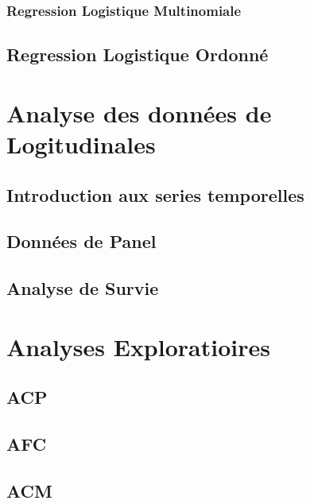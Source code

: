 \documentclass[
]{book}
\begin{document}
\hypertarget{regression-logistique-multinomiale}{%
\subsection{Regression Logistique Multinomiale}\label{regression-logistique-multinomiale}}

\hypertarget{regression-logistique-ordonnuxe9}{%
\section{Regression Logistique Ordonné}\label{regression-logistique-ordonnuxe9}}

\hypertarget{analyse-des-donnuxe9es-de-logitudinales}{%
\chapter{Analyse des données de Logitudinales}\label{analyse-des-donnuxe9es-de-logitudinales}}

\hypertarget{introduction-aux-series-temporelles}{%
\section{Introduction aux series temporelles}\label{introduction-aux-series-temporelles}}

\hypertarget{donnuxe9es-de-panel}{%
\section{Données de Panel}\label{donnuxe9es-de-panel}}

\hypertarget{analyse-de-survie}{%
\section{Analyse de Survie}\label{analyse-de-survie}}

\hypertarget{analyses-exploratioires}{%
\chapter{Analyses Exploratioires}\label{analyses-exploratioires}}

\hypertarget{acp}{%
\section{ACP}\label{acp}}

\hypertarget{afc}{%
\section{AFC}\label{afc}}

\hypertarget{acm}{%
\section{ACM}\label{acm}}

  
\end{document}
